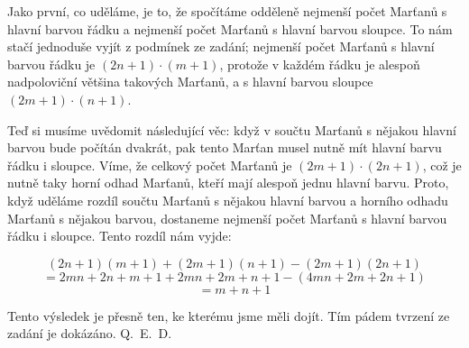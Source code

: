 \documentclass{fkssolpub}
\author{Ondřej Sedláček}
\begin{document}
Jako první, co uděláme, je to, že spočítáme odděleně nejmenší počet Marťanů s hlavní barvou řádku a nejmenší počet Marťanů s hlavní barvou sloupce. To nám stačí jednoduše vyjít z podmínek ze zadání; nejmenší počet Marťanů s hlavní barvou řádku je $(2n + 1) \cdot (m + 1)$, protože v každém řádku je alespoň nadpoloviční většina takových Marťanů, a s hlavní barvou sloupce $(2m + 1) \cdot (n + 1)$.

Teď si musíme uvědomit následující věc: když v součtu Marťanů s nějakou hlavní barvou bude počítán dvakrát, pak tento Marťan musel nutně mít hlavní barvu řádku i sloupce. Víme, že celkový počet Marťanů je $(2m + 1) \cdot (2n + 1)$, což je nutně taky horní odhad Marťanů, kteří mají alespoň jednu hlavní barvu. Proto, když uděláme rozdíl součtu Marťanů s nějakou hlavní barvou a horního odhadu Marťanů s nějakou barvou, dostaneme nejmenší počet Marťanů s hlavní barvou řádku i sloupce. Tento rozdíl nám vyjde:

\[
	(2n + 1)(m + 1) + (2m + 1)(n + 1) - (2m + 1)(2n + 1)\]
\[
	= 2mn + 2n + m + 1 + 2mn + 2m + n + 1 - (4mn + 2m + 2n + 1)
\]
\[
	= m + n + 1
\]

Tento výsledek je přesně ten, ke kterému jsme měli dojít. Tím pádem tvrzení ze zadání je dokázáno. Q.~E.~D.
\end{document}
